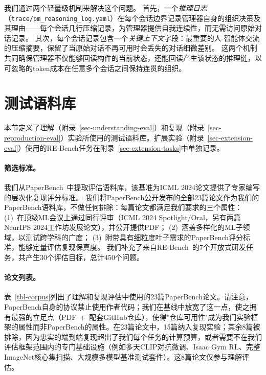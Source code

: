 我们通过两个轻量级机制来解决这个问题。
首先，一个\emph{推理日志}（\texttt{trace/pm\_reasoning\_log.yaml}）在每个会话边界记录管理器自身的组织决策及其理由——每个会话几行压缩记录，为管理器提供自我连续性，而无需访问原始对话记录。
其次，每个会话记录包含一个\emph{关键上下文}字段：最重要的人-智能体交流的压缩摘要，保留了当原始对话不再可用时会丢失的对话细微差别。
这两个机制共同确保管理器不仅能够回读构件的当前状态，还能回读产生该状态的推理链，以可忽略的token成本在任意多个会话之间保持连贯的组织。


\section{测试语料库}
\label{sec-eval-details}
\label{sec-eval-corpus}

本节定义了理解（附录~\ref{sec-understanding-eval}）和复现（附录~\ref{sec-reproduction-eval}）实验所使用的测试语料库。扩展实验（附录~\ref{sec-extension-eval}）使用的RE-Bench任务在附录~\ref{sec-extension-tasks}中单独记录。

\paragraph{筛选标准。}
我们从PaperBench~\citep{starace2025paperbench}中提取评估语料库，该基准为ICML 2024论文提供了专家编写的层次化复现评分标准。
我们将PaperBench公开发布的全部23篇论文作为我们的PaperBench语料库，不做任何排除：每篇论文都满足我们要求的三个属性：
(1)~在顶级ML会议上通过同行评审（ICML 2024 Spotlight/Oral，另有两篇NeurIPS 2024工作坊发展论文），并公开提供PDF；
(2)~涵盖多样化的ML子领域，以测试跨学科的广度；
(3)~附带具有细粒度叶子需求的PaperBench评分标准，能够定量评估复现保真度。
我们补充了来自RE-Bench~\citep{wijk2025rebench}的7个开放式研发任务，共产生30个评估目标，总计450个问题。

\paragraph{论文列表。}
表~\ref{tbl-corpus}列出了理解和复现评估中使用的23篇PaperBench论文。请注意，PaperBench自身的协议禁止使用作者代码；我们在基线中放宽了这一点，使之拥有最强的立足点（PDF~+~配套GitHub仓库），使得"仓库可用性"成为我们实验框架的属性而非PaperBench的属性。在23篇论文中，15篇纳入复现实验；其余8篇被排除，因为忠实的端到端复现超出了我们每个任务的计算预算，或者需要不在我们评估框架范围内的专门基础设施（例如多天CLIP对抗微调、Isaac Gym RL、完整ImageNet核心集扫描、大规模多模型基准测试套件）。这8篇论文仅参与理解评估。

